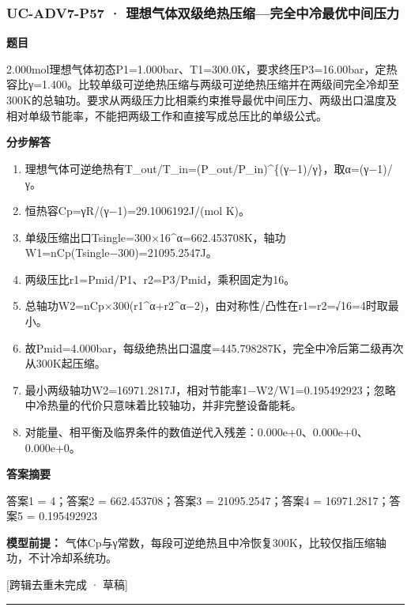 \documentclass[UTF8,11pt,a4paper]{ctexart}
\begin{document}
\subsubsection*{UC-ADV7-P57 · 理想气体双级绝热压缩—完全中冷最优中间压力}
\noindent\textbf{题目}\par
2.000mol理想气体初态P1=1.000bar、T1=300.0K，要求终压P3=16.00bar，定热容比γ=1.400。比较单级可逆绝热压缩与两级可逆绝热压缩并在两级间完全冷却至300K的总轴功。要求从两级压力比相乘约束推导最优中间压力、两级出口温度及相对单级节能率，不能把两级工作和直接写成总压比的单级公式。\par
\medskip\noindent\textbf{分步解答}
\begin{enumerate}
\item 理想气体可逆绝热有T\_out/T\_in=(P\_out/P\_in)\textasciicircum{}\{(γ−1)/γ\}，取α=(γ−1)/γ。
\item 恒热容Cp=γR/(γ−1)=29.1006192J/(mol K)。
\item 单级压缩出口Tsingle=300×16\textasciicircum{}α=662.453708K，轴功W1=nCp(Tsingle−300)=21095.2547J。
\item 两级压比r1=Pmid/P1、r2=P3/Pmid，乘积固定为16。
\item 总轴功W2=nCp×300(r1\textasciicircum{}α+r2\textasciicircum{}α−2)，由对称性/凸性在r1=r2=√16=4时取最小。
\item 故Pmid=4.000bar，每级绝热出口温度=445.798287K，完全中冷后第二级再次从300K起压缩。
\item 最小两级轴功W2=16971.2817J，相对节能率1−W2/W1=0.195492923；忽略中冷热量的代价只意味着比较轴功，并非完整设备能耗。
\item 对能量、相平衡及临界条件的数值逆代入残差：0.000e+0、0.000e+0、0.000e+0。
\end{enumerate}
\noindent\textbf{答案摘要}\par
答案1 = 4；答案2 = 662.453708；答案3 = 21095.2547；答案4 = 16971.2817；答案5 = 0.195492923\par
\noindent\textbf{模型前提：}
气体Cp与γ常数，每段可逆绝热且中冷恢复300K，比较仅指压缩轴功，不计冷却系统功。\par
\noindent\textcolor{red!65!black}{[跨辑去重未完成 · 草稿]} \par
\medskip\hrule\medskip
\end{document}
